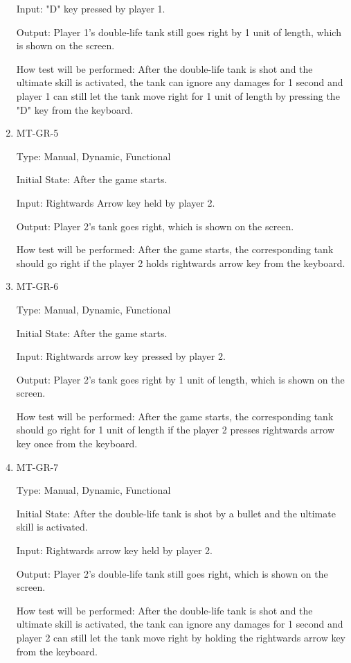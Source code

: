 \documentclass[12pt, titlepage]{article}
\begin{document}
\begin{enumerate}
Input: "D" key pressed by player 1.
					
Output: Player 1's double-life tank still goes right by 1 unit of length, which is shown on the screen.
					
How test will be performed: After the double-life tank is shot and the ultimate skill is activated, the tank can ignore any damages for 1 second and player 1 can still let the tank move right for 1 unit of length by pressing the "D" key from the keyboard.

\item{MT-GR-5\\}

Type: Manual, Dynamic, Functional
					
Initial State: After the game starts.
					
Input: Rightwards Arrow key held by player 2.
					
Output: Player 2's tank goes right, which is shown on the screen.
					
How test will be performed: After the game starts, the corresponding tank should go right if the player 2 holds rightwards arrow key from the keyboard. 
					
\item{MT-GR-6\\}

Type: Manual, Dynamic, Functional
					
Initial State: After the game starts.
					
Input: Rightwards arrow key pressed by player 2.
					
Output: Player 2's tank goes right by 1 unit of length, which is shown on the screen.
					
How test will be performed: After the game starts, the corresponding tank should go right for 1 unit of length if the player 2 presses rightwards arrow key once from the keyboard. 

\item{MT-GR-7\\}

Type: Manual, Dynamic, Functional
					
Initial State: After the double-life tank is shot by a bullet and the ultimate skill is activated.
					
Input: Rightwards arrow key held by player 2.
					
Output: Player 2's double-life tank still goes right, which is shown on the screen.
					
How test will be performed: After the double-life tank is shot and the ultimate skill is activated, the tank can ignore any damages for 1 second and player 2 can still let the tank move right by holding the rightwards arrow key from the keyboard.


\end{enumerate}
\end{document}
